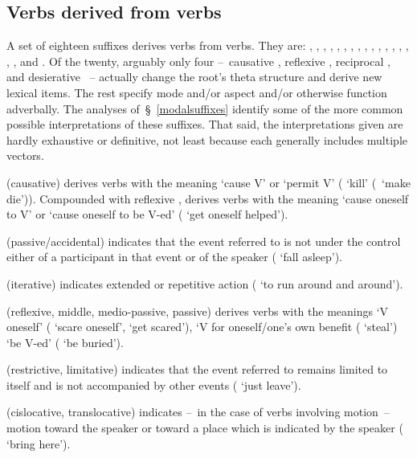 \subsection{Verbs derived from verbs}\label{VDfV}
A set of eighteen suffixes derives verbs from verbs. They are: , , , , , , , , , , , , , , , , , and . Of the twenty, arguably only four --~causative , reflexive , reciprocal , and desierative ~-- actually change the root’s theta structure and derive new lexical items. The rest specify mode and/or aspect and/or otherwise function adverbally. The analyses of~§~\ref{modalsuffixes} identify some of the more common possible interpretations of these suffixes. That said, the interpretations given are hardly exhaustive or definitive, not least because each generally includes multiple vectors. 

 (causative) derives verbs with the meaning ‘cause V’ or ‘permit V’ ( ‘kill’ (\lit~‘make die’)). Compounded with reflexive ,  derives verbs with the meaning ‘cause oneself to V’ or ‘cause oneself to be V-ed’ ( ‘get oneself helped’). 

 (passive/accidental) indicates that the event referred to is not under the control either of a participant in that event or of the speaker ( ‘fall asleep’).

 (iterative) indicates extended or repetitive action ( ‘to run around and around’).

 (reflexive, middle, medio-passive, passive) derives verbs with the meanings ‘V oneself’ ( ‘scare oneself’, ‘get scared’), ‘V for oneself/one’s own benefit ( ‘steal’) ‘be V-ed’ ( ‘be buried’). 

 (restrictive, limitative) indicates that the event referred to remains limited to itself and is not accompanied by other events ( ‘just leave’). 

 (cislocative, translocative) indicates --~in the case of verbs involving motion~-- motion toward the speaker or toward a place which is indicated by the speaker ( ‘bring here’).

